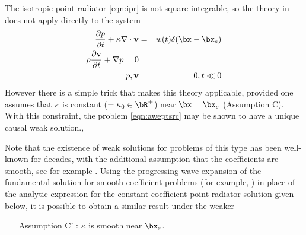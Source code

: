 The isotropic point radiator \ref{eqn:ipr} is not
square-integrable, so the theory in \cite[]{BlazekStolkSymes:13} does
not apply directly to the system
\begin{eqnarray}
\label{eqn:aweptsrc}
\frac{\partial p}{\partial t} + \kappa \nabla \cdot {\bf v} &=&
                                                                w(t)\delta(\bx-\bx_s) \nonumber\\
\rho \frac{\partial {\bf v}}{\partial t} + \nabla p = 0 \nonumber\\
p,{\bf v}&=&0, t \ll 0
\end{eqnarray}
However there is a simple trick that makes this
theory applicable, provided one assumes that $\kappa$ is constant
($=\kappa_0 \in \bR^+$) near
$\bx=\bx_s$ (Assumption C). With this constraint, the problem
\ref{eqn:aweptsrc} may be shown to have a unique causal weak solution.,

Note that the existence of weak solutions for problems of this type
has been 
well-known for decades, with the additional assumption that the coefficients are
smooth, see for example \cite{Lax:PDENotes}. Using the progressing
wave expansion of the fundamental solution for smooth coefficient
problems (for example, \cite{Friedlander:75}) in place of the analytic
expression for the constant-coefficient point radiator solution given
below, it is possible to obtain a similar result under the weaker
\begin{itemize}
\item[Assumption C']: $\kappa$ is smooth near $\bx_s$.
\end{itemize}

